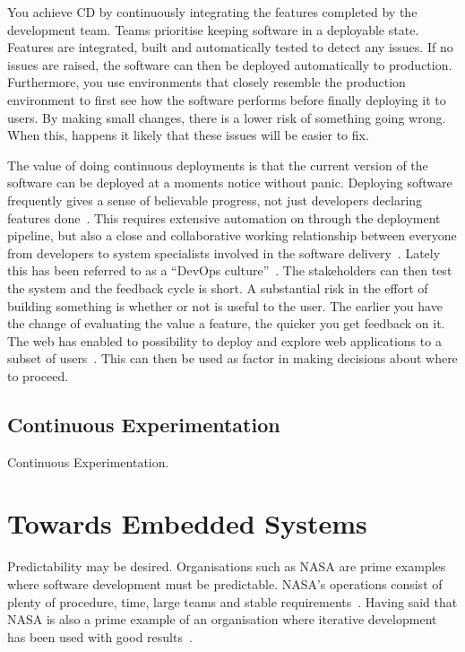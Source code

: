 \documentclass[english]{tktltiki2}
\begin{document}
You achieve CD by continuously integrating the features completed by the development team. Teams prioritise keeping software in a deployable state. Features are integrated, built and automatically tested to detect any issues. If no issues are raised, the software can then be deployed automatically to production. Furthermore, you use environments that closely resemble the production environment to first see how the software performs before finally deploying it to users. By making small changes, there is a lower risk of something going wrong. When this, happens it likely that these issues will be easier to fix.

The value of doing continuous deployments is that the current version of the software can be deployed at a moments notice without panic. Deploying software frequently gives a sense of believable progress, not just developers declaring features done~\cite{Fow13a}. This requires extensive automation on through the deployment pipeline, but also a close and collaborative working relationship between everyone from developers to system specialists involved in the software delivery~\cite{Fow13a}. Lately this has been referred to as a “DevOps culture”~\cite{Fow13a}. The stakeholders can then test the system and the feedback cycle is short. A substantial risk in the effort of building something is whether or not is useful to the user. The earlier you have the change of evaluating the value a feature, the quicker you get feedback on it. The web has enabled to possibility to deploy and explore web applications to a subset of users~\cite{Fow06, Fow13a}. This can then be used as factor in making decisions about where to proceed.

\subsection{Continuous Experimentation}

Continuous Experimentation.


\section{Towards Embedded Systems}

Predictability may be desired. Organisations such as NASA are prime examples where software development must be predictable. NASA’s operations consist of plenty of procedure, time, large teams and stable requirements~\cite{Fow05}. Having said that NASA is also a prime example of an organisation where iterative development has been used with good results~\cite{LB03}.
\end{document}
